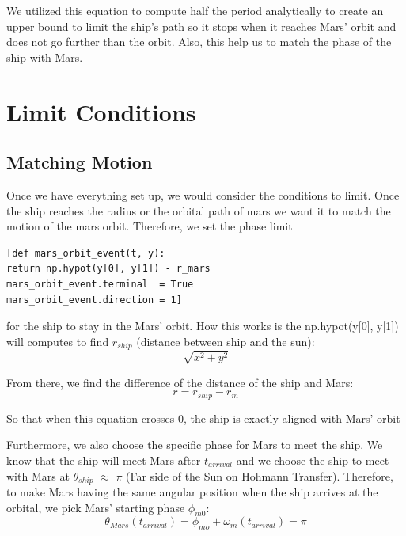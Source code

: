 \documentclass[12pt,a4paper,twocolumn,twoside]{tau-class/tau}
\begin{document}
We utilized this equation to compute half the period analytically to create an upper bound to limit the ship's path so it stops when it reaches Mars' orbit and does not go further than the orbit. Also, this help us to match the phase of the ship with Mars.
\section{Limit Conditions}

    \subsection{Matching Motion}
	
        Once we have everything set up, we would consider the conditions to limit. Once the ship reaches the radius or the orbital path of mars we want it to match the motion of the mars orbit. Therefore, we set the phase limit
        \begin{lstlisting}
[def mars_orbit_event(t, y):
return np.hypot(y[0], y[1]) - r_mars
mars_orbit_event.terminal  = True
mars_orbit_event.direction = 1]
        \end{lstlisting}

      

for the ship to stay in the Mars' orbit. How this works is the np.hypot(y[0], y[1]) will computes to find $r_{ship}$ (distance between ship and the sun): \begin{equation}
    \sqrt{x^2+y^2}
\end{equation}

From there, we find the difference of the distance of the ship and Mars:
\begin{equation}
    r = r_{ship} -r_m
\end{equation}

So that when this equation crosses 0, the ship is exactly aligned with Mars' orbit

Furthermore, we also choose the specific phase for Mars to meet the ship. We know that the ship will meet Mars after $t_{arrival}$ and we choose the ship to meet with Mars at $\theta_{ship}$ $\approx$ $\pi$ (Far side of the Sun on Hohmann Transfer). Therefore, to make Mars having the same angular position when the ship arrives at the orbital, we pick Mars' starting phase $\phi_{m0}$:
\begin{equation}
    \theta_{Mars}(t_{arrival}) = \phi_{mo} + \omega_{m}(t_{arrival}) = \pi
\end{equation}
\end{document}
